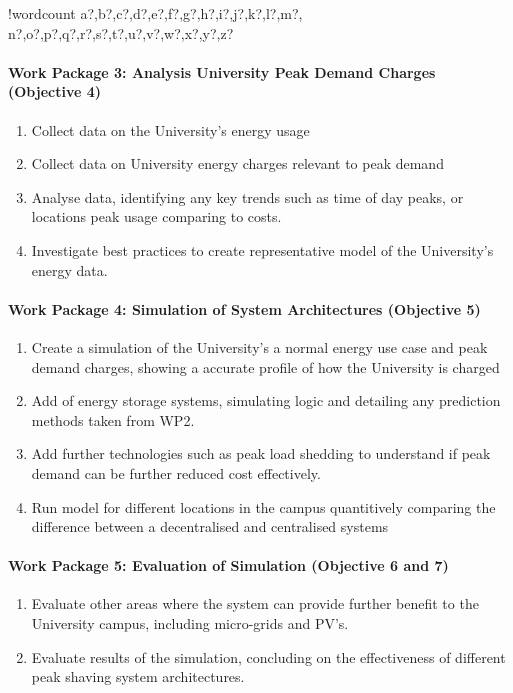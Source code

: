 \documentclass[10pt]{article}
\let\oldparagraph\paragraph
\renewcommand{\paragraph}[1]{\oldparagraph{#1}\mbox{}}
\newcounter{words}
\newenvironment{counted}{%
  \setcounter{words}{0}
  \SearchList!{wordcount}{\stepcounter{words}}
    {a?,b?,c?,d?,e?,f?,g?,h?,i?,j?,k?,l?,m?,
    n?,o?,p?,q?,r?,s?,t?,u?,v?,w?,x?,y?,z?}
  \UndoBoundary{'}
  \SearchOrder{p;}}{%
  \StopSearching}
\begin{document}
\begin{counted}
\paragraph{Work Package 3: Analysis University Peak Demand Charges
(Objective
4)}\label{work-package-3-analysis-university-peak-demand-charges-objective-4}

\begin{enumerate}[ label={3.\arabic*}]
\item Collect data on the University's energy usage
\item Collect data on University energy charges relevant to peak demand
\item Analyse data, identifying any key trends such as time of day peaks, or locations peak usage comparing to costs.
\item Investigate best practices to create representative model of the University's energy data.
\end{enumerate}

\paragraph{Work Package 4: Simulation of System Architectures (Objective
5)}\label{work-package-4-simulation-of-system-architectures-objective-5}

\begin{enumerate}[ label={4.\arabic*}]
\item Create a simulation of the University's a normal energy use case and peak demand charges, showing a accurate profile of how the University is charged
\item Add of energy storage systems, simulating logic and detailing any prediction methods taken from WP2.
\item Add further technologies such as peak load shedding to understand if peak demand can be further reduced cost effectively.
\item Run model for different locations in the campus quantitively comparing the difference between a decentralised and centralised systems
\end{enumerate}

\paragraph{Work Package 5: Evaluation of Simulation (Objective 6 and
7)}\label{work-package-5-evaluation-of-simulation-objective-6-and-7}

\begin{enumerate}[ label={5.\arabic*}]
\item Evaluate other areas where the system can provide further benefit to the University campus, including micro-grids and PV's.
\item Evaluate results of the simulation, concluding on the effectiveness of different peak shaving system architectures.
\end{enumerate}


\end{counted}
\end{document}
